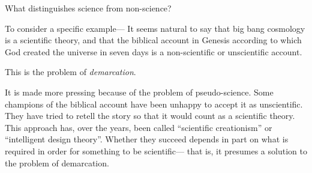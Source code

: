 \documentclass[]{article}
\begin{document}
What distinguishes science from non-science?

To consider a specific  example--- It seems natural to say that big bang cosmology is a scientific theory, and that the biblical account in Genesis according to which God created the universe in seven days is a non-scientific or unscientific account.

This is the problem of \emph{demarcation}.

It is made more pressing because of the problem of pseudo-science. Some champions of the biblical account have been unhappy to accept it as unscientific. They have tried to retell the story so that it would count as a scientific theory. This approach has, over the years, been called ``scientific creationism'' or ``intelligent design theory''. Whether they succeed depends in part on what is required in order for something to be scientific--- that is, it presumes a solution to the problem of demarcation.

\label{theend}
\end{document}
